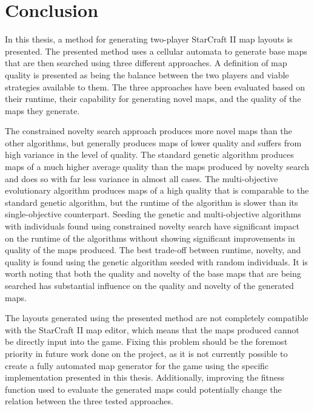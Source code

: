 \chapter{Conclusion}
\label{conclusion}
In this thesis, a method for generating two-player StarCraft II map layouts is presented. The presented method uses a cellular automata to generate base maps that are then searched using three different approaches. A definition of map quality is presented as being the balance between the two players and viable strategies available to them. The three approaches have been evaluated based on their runtime, their capability for generating novel maps, and the quality of the maps they generate.

The constrained novelty search approach produces more novel maps than the other algorithms, but generally produces maps of lower quality and suffers from high variance in the level of quality. The standard genetic algorithm produces maps of a much higher average quality than the maps produced by novelty search and does so with far less variance in almost all cases. The multi-objective evolutionary algorithm produces maps of a high quality that is comparable to the standard genetic algorithm, but the runtime of the algorithm is slower than its single-objective counterpart. Seeding the genetic and multi-objective algorithms with individuals found using constrained novelty search have significant impact on the runtime of the algorithms without showing significant improvements in quality of the maps produced. The best trade-off between runtime, novelty, and quality is found using the genetic algorithm seeded with random individuals. It is worth noting that both the quality and novelty of the base maps that are being searched has substantial influence on the quality and novelty of the generated maps.

The layouts generated using the presented method are not completely compatible with the StarCraft II map editor, which means that the maps produced cannot be directly input into the game. Fixing this problem should be the foremost priority in future work done on the project, as it is not currently possible to create a fully automated map generator for the game using the specific implementation presented in this thesis. Additionally, improving the fitness function used to evaluate the generated maps could potentially change the relation between the three tested approaches.